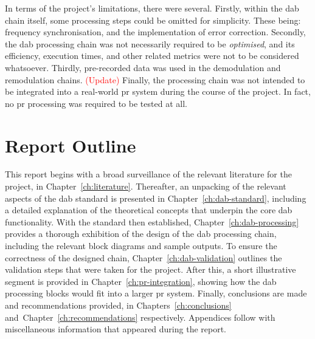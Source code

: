 \documentclass[class=report,11pt,crop=false]{standalone}
\begin{document}
In terms of the project's limitations, there were several. Firstly, within the \gls{dab} chain itself, some processing steps could be omitted for simplicity. These being: frequency synchronisation, and the implementation of error correction. Secondly, the \gls{dab} processing chain was not necessarily required to be \emph{optimised}, and its efficiency, execution times, and other related metrics were not to be considered whatsoever. Thirdly, pre-recorded data was used in the demodulation and remodulation chains. \textcolor{red}{(Update)} Finally, the processing chain was not intended to be integrated into a real-world \gls{pr} system during the course of the project. In fact, no \gls{pr} processing was required to be tested at all.

\section{Report Outline}
This report begins with a broad surveillance of the relevant literature for the project, in Chapter~\ref{ch:literature}. Thereafter, an unpacking of the relevant aspects of the \gls{dab} standard is presented in Chapter~\ref{ch:dab-standard}, including a detailed explanation of the theoretical concepts that underpin the core \gls{dab} functionality. With the standard then established, Chapter~\ref{ch:dab-processing} provides a thorough exhibition of the design of the \gls{dab} processing chain, including the relevant block diagrams and sample outputs. To ensure the correctness of the designed chain, Chapter~\ref{ch:dab-validation} outlines the validation steps that were taken for the project. After this, a short illustrative segment is provided in Chapter~\ref{ch:pr-integration}, showing how the \gls{dab} processing blocks would fit into a larger \gls{pr} system. Finally, conclusions are made and recommendations provided, in Chapters~\ref{ch:conclusions} and~Chapter~\ref{ch:recommendations} respectively. Appendices follow with miscellaneous information that appeared during the report.



\ifstandalone

\printnoidxglossary[type=\acronymtype,nonumberlist]
\fi
\end{document}
